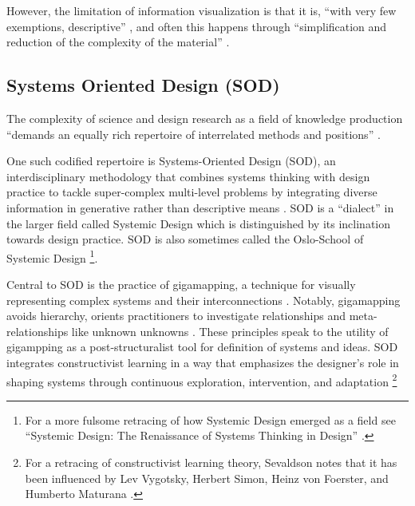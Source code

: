 However, the limitation of information visualization is that it is, “with very few exemptions, descriptive” \citep[p. 186]{sevaldson_designing_2022}, and often this happens through “simplification and reduction of the complexity of the material” \citep[p. 186]{sevaldson_designing_2022}.


\subsection{Systems Oriented Design (SOD)}
The complexity of science and design research as a field of knowledge production “demands an equally rich repertoire of interrelated methods and positions” \citep[p. 8]{sevaldson_discussions_2010-1}. 

One such codified repertoire is Systems-Oriented Design (SOD), an interdisciplinary methodology that combines systems thinking with design practice to tackle super-complex multi-level problems by integrating diverse information in generative rather than descriptive means \citep[p. 27, p. 152, p. 157]{sevaldson_designing_2022}. SOD is a “dialect” in the larger field called Systemic Design which is distinguished by its inclination towards design practice. SOD is also sometimes called the Oslo-School of Systemic Design \citep[p. 2]{sevaldson_designing_2022}\footnote{For a more fulsome retracing of how Systemic Design emerged as a field see “Systemic Design: The Renaissance of Systems Thinking in Design” \citep[p. 186-188]{sevaldson_designing_2022}.}.

Central to SOD is the practice of gigamapping, a technique for visually representing complex systems and their interconnections \citep[p. 26]{sevaldson_designing_2022}. Notably, gigamapping avoids hierarchy, orients practitioners to investigate relationships and meta-relationships like unknown unknowns \citep[p. 55, p. 353-357]{sevaldson_designing_2022}. These principles speak to the utility of gigampping as a post-structuralist tool for definition of systems and ideas. SOD integrates constructivist learning in a way that emphasizes the designer's role in shaping systems through continuous exploration, intervention, and adaptation \citep[p. 153]{sevaldson_designing_2022} \footnote{For a retracing of constructivist learning theory, Sevaldson notes that it has been influenced by Lev Vygotsky, Herbert Simon, Heinz von Foerster, and Humberto Maturana \citep[p. 153]{sevaldson_designing_2022}.}


